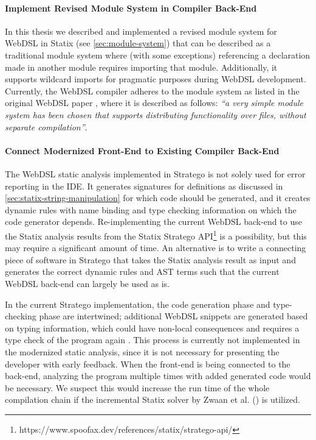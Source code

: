   \paragraph{Implement Revised Module System in Compiler Back-End} In this thesis we described and implemented a revised module system for WebDSL in Statix (see \cref{sec:module-system}) that can be described as a traditional module system where (with some exceptions) referencing a declaration made in another module requires importing that module. Additionally, it supports wildcard imports for pragmatic purposes during WebDSL development. Currently, the WebDSL compiler adheres to the module system as listed in the original WebDSL paper \autocite{Visser2007}, where it is described as follows: \textit{``a very simple module system has been chosen that supports distributing functionality over files, without separate compilation''}. 

  \paragraph{Connect Modernized Front-End to Existing Compiler Back-End} The WebDSL static analysis implemented in Stratego is not solely used for error reporting in the IDE. It generates signatures for definitions as discussed in \cref{sec:statix-string-manipulation} for which code should be generated, and it creates dynamic rules with name binding and type checking information on which the code generator depends. Re-implementing the current WebDSL back-end to use the Statix analysis results from the Statix Stratego API\footnote{https://www.spoofax.dev/references/statix/stratego-api/} is a possibility, but this may require a significant amount of time. An alternative is to write a connecting piece of software in Stratego that takes the Statix analysis result as input and generates the correct dynamic rules and AST terms such that the current WebDSL back-end can largely be used as is.

  In the current Stratego implementation, the code generation phase and type-checking phase are intertwined; additional WebDSL snippets are generated based on typing information, which could have non-local consequences and requires a type check of the program again \autocite{HemelKGV10}. This process is currently not implemented in the modernized static analysis, since it is not necessary for presenting the developer with early feedback. When the front-end is being connected to the back-end, analyzing the program multiple times with added generated code would be necessary. We suspect this would increase the run time of the whole compilation chain if the incremental Statix solver by Zwaan et al. (\citeyear{ZwaanAV22}) is utilized.

